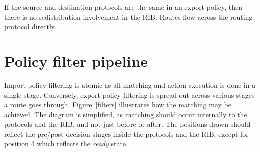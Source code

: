 \documentclass{article}
\begin{document}
If the source and destination protocols are the same in an export policy, then
there is no redistribution involvement in the RIB. Routes flow across the
routing protocol directly.





\section{Policy filter pipeline}
Import policy filtering is atomic as all matching and action execution is done
in a single stage. Conversely, export policy filtering is spread out across
various stages a route goes through. Figure~\ref{filters} illustrates how the
matching may be achieved. The diagram is simplified, as matching should occur
internally to the protocols and the RIB, and not just before or after. The
positions drawn should reflect the pre/post decision stages inside the protocols
and the RIB, except for position 4 which reflects the {\em ready} state.
\end{document}
